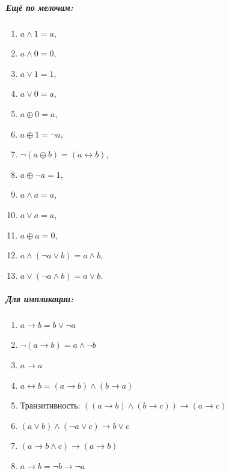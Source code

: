 \begin{thm}
\subparagraph{Ещё по мелочам:}
\begin{enumerate}
\item $a \land 1 = a$,
\item $a \land 0 = 0$,
\item $a \lor 1 = 1$,
\item $a \lor 0 = a$,
\item $a \oplus 0 = a$,
\item $a \oplus 1 = \neg a$,
\item $\neg (a \oplus b) = (a \leftrightarrow b)$,
\item $a \oplus \neg a = 1$,
\item $a\land a = a$,
\item $a \lor a = a$,
\item $a \oplus a = 0$,
\item $a \land (\neg a \lor b) = a \land b$,
\item $a \lor (\neg a \land b) = a \lor b$.
\end{enumerate}

\subparagraph{Для импликации:}
\begin{enumerate}
\item $a \rightarrow b = b \vee \neg a$
\item $\neg(a \rightarrow b) = a \wedge \neg b$
\item $a \rightarrow a$
\item $a \leftrightarrow b = (a \rightarrow b) \wedge (b\rightarrow a)$
\item Транзитивность: $((a \rightarrow b) \wedge (b \rightarrow c)) \rightarrow (a \rightarrow c)$
\item $(a \vee b) \wedge (\neg a \vee c) \rightarrow b \vee c$
\item $(a \rightarrow b \wedge c) \rightarrow (a \rightarrow b)$
\item $a \rightarrow b = \neg b \rightarrow \neg a$
\end{enumerate}
\end{thm}

